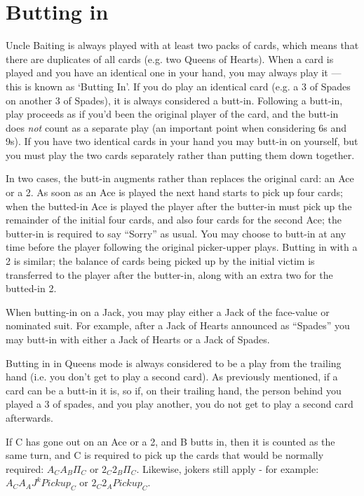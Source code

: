 \documentclass[12pt]{article}
\begin{document}
\section{Butting in}
\label{buttingIn}

Uncle Baiting is always played with at least two packs of cards, which means that there are duplicates of all
cards (e.g. two Queens of Hearts).  When a card is played and you have an identical one in your hand, you may
always play it --- this is known as `Butting In'. If you do play an identical card (e.g. a 3 of Spades on another 3 of Spades), it is always considered a butt-in.  Following a butt-in, play proceeds as if you'd been the
original player of the card, and the butt-in does \emph{not} count as a separate play (an important point when
considering 6s and 9s).  If you have two identical cards in your hand you may butt-in on yourself, but you
must play the two cards separately rather than putting them down together.

In two cases, the butt-in augments rather than replaces the original card:
an Ace or a 2.  As soon as an Ace is played the next hand starts to pick up
four cards;  when the butted-in Ace is played the player after the butter-in
must pick up the remainder of the initial four cards, and also four cards for
the second Ace;  the butter-in is required to say ``Sorry'' as usual.  You
may choose to butt-in at any time before the player following
the original picker-upper plays.   Butting in with a 2 is similar;  the balance
of cards being picked up by the initial victim is transferred to the player
after the butter-in, along with an extra two for the butted-in 2.

When butting-in on a Jack, you may play either a Jack of the face-value or nominated suit. For
example, after a Jack of Hearts announced as ``Spades'' you may butt-in with either
a Jack of Hearts or a Jack of Spades.

Butting in in Queens mode is always considered to be a play from the trailing hand (i.e. you
don't get to play a second card). As previously mentioned, if a card can be a butt-in it is, so if, on their trailing hand, the person behind you played a 3 of spades, and you play another, you do not get to play a second card afterwards.

If C has gone out on an Ace or a 2, and B butts in, then it is counted as the same turn, and C is required to pick up the cards that would be normally required: $A_C A_B \Pi_C$ or $2_C 2_B \Pi_C$. Likewise, jokers still apply - for example: $A_C A_A J^k Pickup_C$ or $2_C 2_A Pickup_C$.
\end{document}
